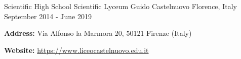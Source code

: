 \begin{cventries}
  \cventry
    {Scientific High School} %
    {Scientific Lyceum Guido Castelnuovo} %
    {Florence, Italy} %
    {September 2014 - June 2019} %
    {
      \begin{cvitems} %
        \item {\textbf{Address:} Via Alfonso la Marmora 20, 50121 Firenze (Italy)}
        \item {\textbf{Website:} \href{https://www.liceocastelnuovo.edu.it}{https://www.liceocastelnuovo.edu.it}}
      \end{cvitems}
    }

\end{cventries}
